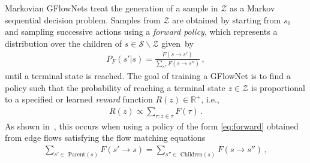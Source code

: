 Markovian GFlowNets treat the generation of a sample 
in $\mathcal{Z}$ 
as a Markov sequential decision problem. 
Samples from $\mathcal{Z}$ 
are obtained by starting from $s_0$ and 
sampling successive actions using a {\it forward policy}, 
which represents a distribution over the children of $s \in \mathcal{S} \backslash  \mathcal{Z}$ given~by 
\begin{align}
P_F(s'|s) = \frac{F(s \rightarrow s')}
{\sum_{s''} F(s \rightarrow s'') } \,,
\label{eq:forward}
\end{align}
until a terminal state is reached.  
The goal of training a GFlowNet is to find a policy such that 
the probability of reaching a terminal state $z \in \mathcal{Z}$ is proportional to a specified or learned {\it reward} function $R(z) \in \mathbb{R}^+$, i.e., 
\begin{align}
    R(z) \varpropto  \sum_{\tau: z \in \tau } F(\tau) \,.
    \label{eq:R_GFN}
\end{align}
As shown in~\cite{bengio2021flow}, this occurs 
when using a policy of the form \autoref{eq:forward} obtained from edge flows 
satisfying the flow matching equations
\begin{align}
    \sum_{s' \in \text{ Parent}(s) } \!\!\!\!\!\! F( s' \rightarrow s)  = 
    \!\!\!\!\!\!
    \sum_{s'' \in \text{ Children}(s) } \!\!\!\!\!\! F(s \rightarrow s'')\,,
\label{eq:flow_match}
\end{align}

